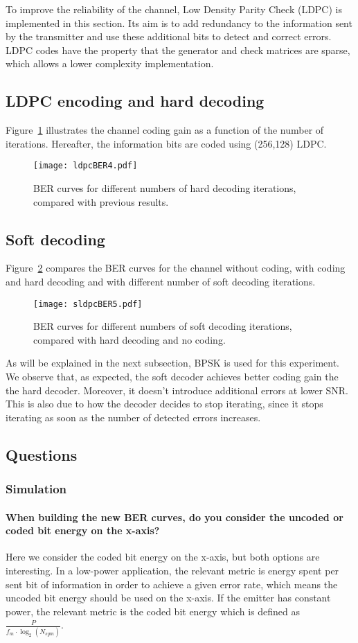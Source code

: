 To improve the reliability of the channel, Low Density Parity Check (LDPC) is implemented in this section. Its aim is to add redundancy to the information sent by the transmitter and use these additional bits to detect and correct errors. LDPC codes have the property that the generator and check matrices are sparse, which allows a lower complexity implementation.
\subsection{LDPC encoding and hard decoding}
Figure~\ref{fig:ldpcBER} illustrates the channel coding gain as a function of the number of iterations.
Hereafter, the information bits are coded using (256,128) LDPC.
\begin{figure}[htbp]
    \centering
    \texttt{[image: ldpcBER4.pdf]}
    \caption{BER curves for different numbers of hard decoding iterations, compared with previous results.\label{fig:ldpcBER}}
\end{figure}

\subsection{Soft decoding}
Figure~\ref{fig:sldpcBER} compares the BER curves for the channel without coding, with coding and hard decoding and with different number of soft decoding iterations.
\begin{figure}[htbp]
    \centering
    \texttt{[image: sldpcBER5.pdf]}
    \caption{BER curves for different numbers of soft decoding iterations, compared with hard decoding and no coding.\label{fig:sldpcBER}}
\end{figure}
As will be explained in the next subsection, BPSK is used for this experiment.
We observe that, as expected, the soft decoder achieves better coding gain the the hard decoder. Moreover, it doesn't introduce additional errors at lower SNR. This is also due to how the decoder decides to stop iterating, since it stops iterating as soon as the number of detected errors increases.

\subsection{Questions}
\subsubsection{Simulation}
\paragraph{When building the new BER curves, do you consider the uncoded or coded bit energy on the x-axis?}
Here we consider the coded bit energy on the x-axis, but both options are interesting.
In a low-power application, the relevant metric is energy spent per sent bit of information in order to achieve a given error rate, which means the uncoded bit energy should be used on the x-axis.
If the emitter has constant power, the relevant metric is the coded bit energy which is defined as $\frac{P}{f_m \cdot \log_2(N_{sym})}$.

